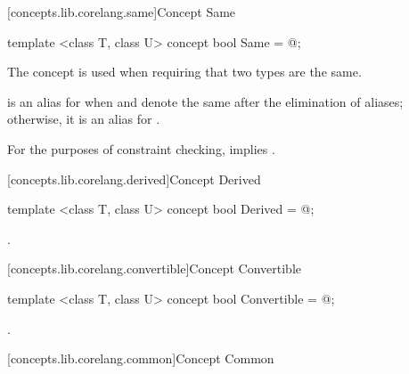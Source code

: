 \begin{addedblock}
[concepts.lib.corelang.same]{Concept Same}

%
\begin{itemdecl}
template <class T, class U>
concept bool Same = @\seebelow@;
\end{itemdecl}

\begin{itemdescr}
{\color{oldclr}
\pnum
The  concept is used when requiring that two types are the same.
}

\pnum
{} is an alias for  when  and 
denote the same  after the elimination of aliases; otherwise, it is an alias for
.

\pnum
\remarks For the purposes of constraint checking,  implies
.
\end{itemdescr}

[concepts.lib.corelang.derived]{Concept Derived}

%
\begin{itemdecl}
template <class T, class U>
concept bool Derived = @\seebelow@;
\end{itemdecl}

\begin{itemdescr}
\pnum
{}.
\end{itemdescr}

[concepts.lib.corelang.convertible]{Concept Convertible}

%
\begin{itemdecl}
template <class T, class U>
concept bool Convertible = @\seebelow@;
\end{itemdecl}

\begin{itemdescr}
\pnum
{}.
\end{itemdescr}

[concepts.lib.corelang.common]{Concept Common}


\end{addedblock}
